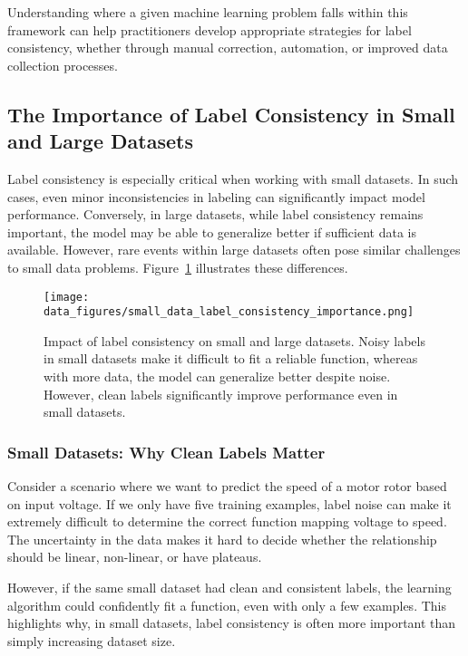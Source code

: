 \documentclass[12pt,openany]{book}
\begin{document}
Understanding where a given machine learning problem falls within this framework can help practitioners develop appropriate strategies for label consistency, whether through manual correction, automation, or improved data collection processes.


\subsection{The Importance of Label Consistency in Small and Large Datasets}

Label consistency is especially critical when working with small datasets. In such cases, even minor inconsistencies in labeling can significantly impact model performance. Conversely, in large datasets, while label consistency remains important, the model may be able to generalize better if sufficient data is available. However, rare events within large datasets often pose similar challenges to small data problems. Figure~\ref{fig:small_data_label_consistency_importance} illustrates these differences.

\begin{figure}[H]
    \centering
    \texttt{[image: data\_figures/small\_data\_label\_consistency\_importance.png]}
    \caption{Impact of label consistency on small and large datasets. Noisy labels in small datasets make it difficult to fit a reliable function, whereas with more data, the model can generalize better despite noise. However, clean labels significantly improve performance even in small datasets.}
    \label{fig:small_data_label_consistency_importance}
\end{figure}

\subsubsection{Small Datasets: Why Clean Labels Matter}
Consider a scenario where we want to predict the speed of a motor rotor based on input voltage. If we only have five training examples, label noise can make it extremely difficult to determine the correct function mapping voltage to speed. The uncertainty in the data makes it hard to decide whether the relationship should be linear, non-linear, or have plateaus. \newline

However, if the same small dataset had clean and consistent labels, the learning algorithm could confidently fit a function, even with only a few examples. This highlights why, in small datasets, label consistency is often more important than simply increasing dataset size.
\end{document}

